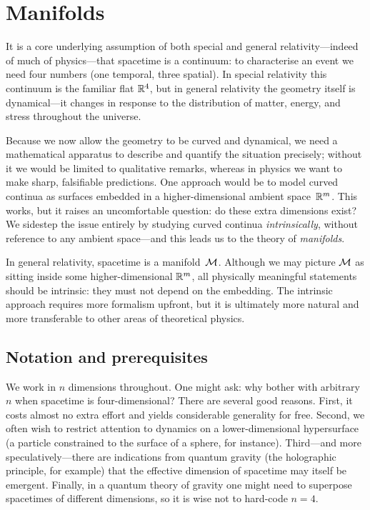
\section{Manifolds}\label{sec:manifolds}

It is a core underlying assumption of both special and general
relativity---indeed of much of physics---that spacetime is a
continuum: to characterise an event we need four numbers (one
temporal, three spatial).  In special relativity this continuum is
the familiar flat $\mathbb{R}^{4}$, but in general relativity the geometry
itself is dynamical---it changes in response to the distribution of
matter, energy, and stress throughout the universe.

Because we now allow the geometry to be curved and dynamical, we need
a mathematical apparatus to describe and quantify the situation
precisely; without it we would be limited to qualitative remarks,
whereas in physics we want to make sharp, falsifiable predictions.
One approach would be to model curved continua as surfaces embedded
in a higher-dimensional ambient space~$\mathbb{R}^{m}$.  This works, but it
raises an uncomfortable question: do these extra dimensions exist?
We sidestep the issue entirely by studying curved continua
\emph{intrinsically}, without reference to any ambient
space---and this leads us to the theory of \emph{manifolds}.

\begin{intuition}
  In general relativity, spacetime is a manifold~$\mathcal{M}$.
  Although we may picture $\mathcal{M}$ as sitting inside some higher-dimensional
  $\mathbb{R}^{m}$, all physically meaningful statements should be intrinsic:
  they must not depend on the embedding.
  The intrinsic approach requires more formalism upfront, but it is
  ultimately more natural and more transferable to other areas of
  theoretical physics.
\end{intuition}

\subsection{Notation and prerequisites}

We work in $n$ dimensions throughout.  One might ask: why bother
with arbitrary~$n$ when spacetime is four-dimensional?  There are
several good reasons.  First, it costs almost no extra effort and
yields considerable generality for free.  Second, we often wish to
restrict attention to dynamics on a lower-dimensional hypersurface
(a particle constrained to the surface of a sphere, for instance).
Third---and more speculatively---there are indications from
quantum gravity (the holographic principle, for example) that the
effective dimension of spacetime may itself be emergent.  Finally,
in a quantum theory of gravity one might need to superpose spacetimes
of different dimensions, so it is wise not to hard-code $n=4$.

